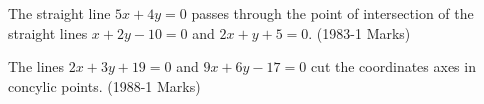 \iffalse
\title{Straight Lines and Pair of Straight Lines}
\author{EE24BTECH11041 - Mohit}
\section {true-false}
\fi
    \item The straight line $5x+4y=0$ passes through the point of intersection of the straight lines $x+2y-10=0$ and $2x+y+5=0$.
    \hfill(1983-1 Marks)
    \item The lines $2x+3y+19=0$ and $9x+6y-17=0$ cut the coordinates axes in concylic points.
    \hfill(1988-1 Marks)

